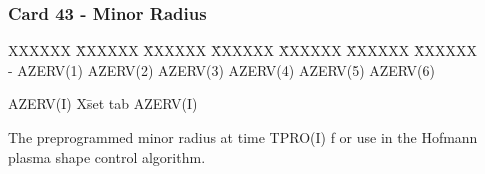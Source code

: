 \newpage \subsubsection{Card 43 - Minor Radius}
\begin{tabbing}
XXXXXX \= XXXXXX \= XXXXXX \= XXXXXX \= XXXXXX \= XXXXXX \=
XXXXXX       \\
\footnotesize - \>\footnotesize  AZERV(1) \>\footnotesize AZERV(2) \>\footnotesize AZERV(3)
\>\footnotesize AZERV(4) \>\footnotesize AZERV(5) \>\footnotesize AZERV(6) \\
\end{tabbing}
\begin{tabbing}
AZERV(I) X\= set tab \kill
AZERV(I) \> \parbox[t]{\width}{The preprogrammed minor radius at time TPRO(I) f
or use in the Hofmann plasma shape control algorithm.}\\
\end{tabbing}
\pagebreak
